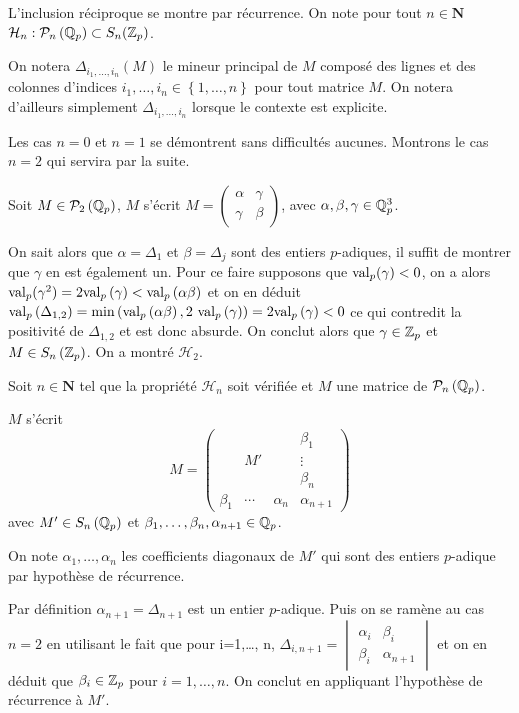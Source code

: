  L'inclusion réciproque se montre par récurrence. On note pour tout $n \in \mathbf{N}$ $\mathcal{H}_n :  \mathcal{P}_n \left( \mathbb{Q}_p \right) \subset  S_n( \mathbb {Z}_p  )$.

 
 On notera $ \Delta_{i_1,\ldots,i_n}\left( M \right) $ le mineur principal de $M$ composé des lignes et des colonnes d'indices $i_1,\ldots,i_n \in \left\{ 1,\ldots,n \right\} $ pour tout matrice $M$. On notera d'ailleurs simplement  $ \Delta_{i_1,\ldots,i_n}$ lorsque le contexte est explicite.

 Les cas $n=0$ et $n=1$ se démontrent sans difficultés aucunes. Montrons le cas $n=2$ qui servira par la suite.

 Soit $M \in \mathcal{P}_2\left( \mathbb{Q}_p \right) $, $M$ s'écrit $M = \begin{pmatrix} \alpha & \gamma \\ \gamma & \beta \end{pmatrix}$, avec $\alpha, \beta, \gamma \in \mathbb{Q}_p^3$.



 On sait alors que $ \alpha = \Delta_1$ et $ \beta = \Delta_j$ sont des entiers $p$-adiques, il suffit de montrer que $\gamma$ en est également un. Pour ce faire supposons que $ \text{val}_p (\gamma) < 0$, on a alors $\text{val}_p ( \gamma^2) = 2 \text{val}_p\left( \gamma \right) < \text{val}_p\left( \alpha \beta \right) $ et on en déduit $ \text{val}_p \left( \Delta_{1,2} \right)= \min\left( \text{val}_p\left( \alpha \beta \right),2~ \text{val}_p \left( \gamma \right) \right) = 2 \text{val}_p\left( \gamma \right) <0 $ ce qui contredit la positivité de $\Delta_{1,2}$ et est donc absurde. On conclut alors que $ \gamma \in  \mathbb {Z}_p $ et $M \in  S_n\left(  \mathbb {Z}_p  \right) $. On a montré $\mathcal{H}_2$. 

 Soit $n \in \mathbf{N}$ tel que la propriété $\mathcal{H}_n $ soit vérifiée et $M$ une matrice de $\mathcal{P}_n \left( \mathbb{Q}_p \right)$. 

 $M$ s'écrit 
 \[
 M= \left(\begin{array}{ccc|c}
  &      &     &   \beta_1  \\
  &  M'  &     &\vdots\\
  &      &     &   \beta_n  \\
\hline
\beta_1 &\cdots&  \alpha_n  & \alpha_{n+1}
\end{array} \right)
\]
avec $M' \in S_n\left( \mathbb{Q}_p \right) $ et $\beta_1,\ldots, \beta_n, \alpha_{n+1} \in \mathbb{Q}_p$.

On note $ \alpha_1,\ldots, \alpha_n$ les coefficients diagonaux de $M'$ qui sont des entiers $p$-adique par hypothèse de récurrence. 


 Par définition $ \alpha_{n+1} = \Delta_{n+1}$ est un entier $p$-adique. Puis on se ramène au cas $n=2$ en utilisant le fait que pour i=1,\ldots, n, $\Delta_{i,n+1} = \begin{vmatrix} \alpha_{i} & \beta_{i}\\ \beta_{i} & \alpha_{n+1} \end{vmatrix} $ et on en déduit que $\beta_{i} \in  \mathbb {Z}_p $ pour $i=1,\ldots,n$. On conclut en appliquant l'hypothèse de récurrence à $M'$.


